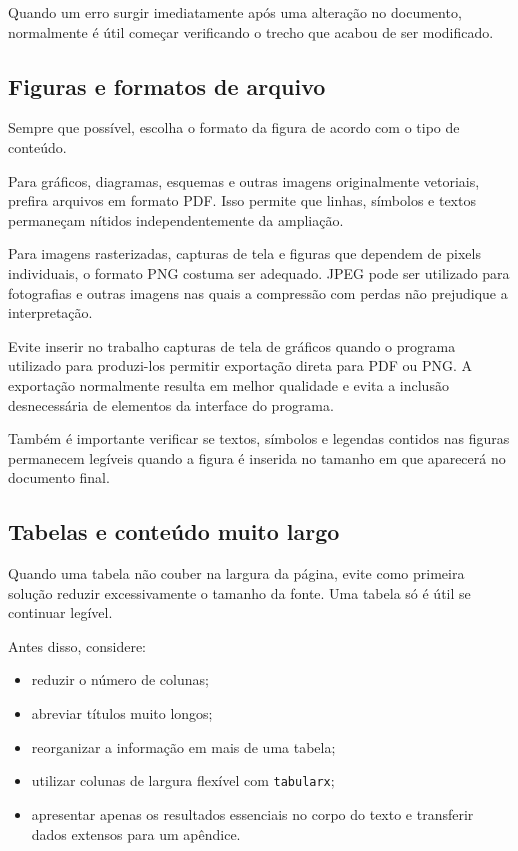 Quando um erro surgir imediatamente após uma alteração no documento, normalmente é útil começar verificando o trecho que acabou de ser modificado.

\subsection{Figuras e formatos de arquivo}
\label{ssec:formatos_figuras}

Sempre que possível, escolha o formato da figura de acordo com o tipo de conteúdo.

Para gráficos, diagramas, esquemas e outras imagens originalmente vetoriais, prefira arquivos em formato PDF. Isso permite que linhas, símbolos e textos permaneçam nítidos independentemente da ampliação.

Para imagens rasterizadas, capturas de tela e figuras que dependem de pixels individuais, o formato PNG costuma ser adequado. JPEG pode ser utilizado para fotografias e outras imagens nas quais a compressão com perdas não prejudique a interpretação.

Evite inserir no trabalho capturas de tela de gráficos quando o programa utilizado para produzi-los permitir exportação direta para PDF ou PNG. A exportação normalmente resulta em melhor qualidade e evita a inclusão desnecessária de elementos da interface do programa.

Também é importante verificar se textos, símbolos e legendas contidos nas figuras permanecem legíveis quando a figura é inserida no tamanho em que aparecerá no documento final.

\subsection{Tabelas e conteúdo muito largo}
\label{ssec:tabelas_largas}

Quando uma tabela não couber na largura da página, evite como primeira solução reduzir excessivamente o tamanho da fonte. Uma tabela só é útil se continuar legível.

Antes disso, considere:

\begin{itemize}
\item reduzir o número de colunas;
\item abreviar títulos muito longos;
\item reorganizar a informação em mais de uma tabela;
\item utilizar colunas de largura flexível com \verb|tabularx|;
\item apresentar apenas os resultados essenciais no corpo do texto e
transferir dados extensos para um apêndice.
\end{itemize}

